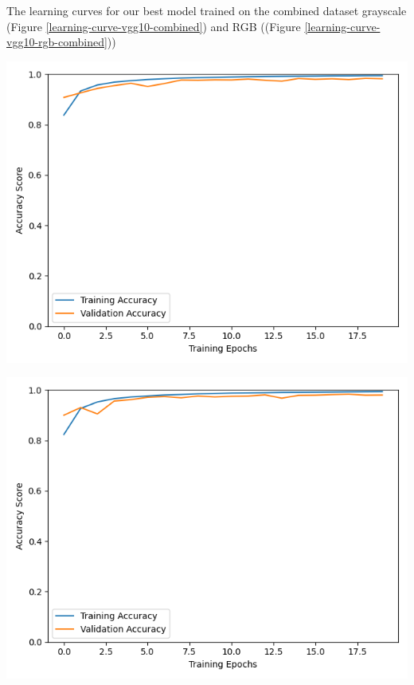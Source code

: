\documentclass[11pt, letterpaper]{article}
\newenvironment{Figure}
  {\par\medskip\noindent\minipage{\linewidth}}
  {\endminipage\par\medskip}
\begin{document}
\begin{multicols}{2}
  The learning curves for our best model trained on the combined dataset grayscale
  (Figure \ref{learning-curve-vgg10-combined}) and RGB ((Figure \ref{learning-curve-vgg10-rgb-combined}))

  \begin{Figure}
    \centering
    \includegraphics[width=1.0\textwidth]{figures/learning-curve-vgg10-dlib-hflip-combined-125-0001.png}
    \label{learning-curve-vgg10-combined}
  \end{Figure}

  \begin{Figure}
    \centering
    \includegraphics[width=1.0\textwidth]{figures/learning-curve-vgg10-dlib-hflip-rgb-combined-125-0001.png}
    \label{learning-curve-vgg10-rgb-combined}
  \end{Figure}



\end{multicols}
\end{document}
